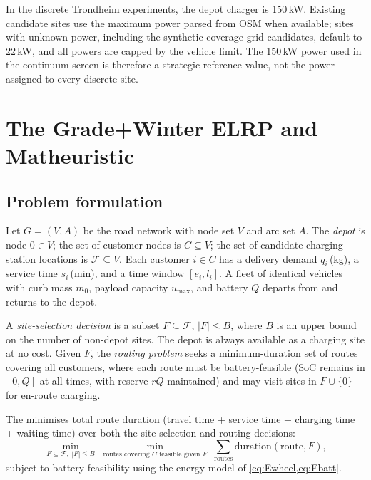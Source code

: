 \documentclass[review,3p,authoryear]{elsarticle}
\newcommand{\ELRP}{\text{GW-ELRP}}
\begin{document}
In the discrete Trondheim experiments, the depot charger is 150\,kW.
Existing candidate sites use the maximum power parsed from OSM when
available; sites with unknown power, including the synthetic coverage-grid
candidates, default to 22\,kW, and all powers are capped by the vehicle
limit.  The 150\,kW power used in the continuum screen is therefore a
strategic reference value, not the power assigned to every discrete site.

\section{The Grade+Winter ELRP and Matheuristic}
\label{sec:elrp}

\subsection{Problem formulation}
\label{sec:formulation}

Let $G = (V, A)$ be the road network with node set $V$ and arc set $A$.
The \emph{depot} is node $0 \in V$; the set of customer nodes is
$C \subseteq V$; the set of candidate charging-station locations is
$\mathcal{F} \subseteq V$.  Each customer $i \in C$ has a delivery demand
$q_i$\,(kg), a service time $s_i$\,(min), and a time window $[e_i, l_i]$.
A fleet of identical vehicles with curb mass $m_0$, payload capacity
$u_{\max}$, and battery $Q$ departs from and returns to the depot.

A \emph{site-selection decision} is a subset $F \subseteq \mathcal{F}$,
$|F| \le B$, where $B$ is an upper bound on the number of non-depot sites.
The depot is always
available as a charging site at no cost.  Given $F$, the \emph{routing
problem} seeks a minimum-duration set of routes covering all customers,
where each route must be battery-feasible (SoC remains in $[0, Q]$ at all
times, with reserve $rQ$ maintained) and may visit sites in $F \cup \{0\}$
for en-route charging.

The \emph{\ELRP{}} minimises total route duration (travel time + service
time + charging time + waiting time) over both the site-selection and
routing decisions:
\begin{equation}
  \min_{F \subseteq \mathcal{F},\; |F| \le B} \;
  \min_{\text{routes covering } C \text{ feasible given } F} \;
  \sum_{\text{routes}} \text{duration}(\text{route}, F),
\end{equation}
subject to battery feasibility using the energy model of
\cref{eq:Ewheel,eq:Ebatt}.
\end{document}
